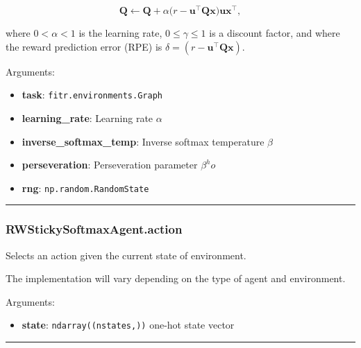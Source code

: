 \[
\mathbf Q \gets \mathbf Q + \alpha \big(r - \mathbf u^\top \mathbf Q \mathbf x \big) \mathbf u \mathbf x^\top,
\]

where \(0 < \alpha < 1\) is the learning rate, \(0 \leq \gamma \leq 1\)
is a discount factor, and where the reward prediction error (RPE) is
\(\delta = (r - \mathbf u^\top \mathbf Q \mathbf x)\).

Arguments:

\begin{itemize}
\tightlist
\item
  \textbf{task}: \texttt{fitr.environments.Graph}
\item
  \textbf{learning\_rate}: Learning rate \(\alpha\)
\item
  \textbf{inverse\_softmax\_temp}: Inverse softmax temperature \(\beta\)
\item
  \textbf{perseveration}: Perseveration parameter \(\beta^ ho\)
\item
  \textbf{rng}: \texttt{np.random.RandomState}
\end{itemize}

\begin{center}\rule{0.5\linewidth}{\linethickness}\end{center}

\subsubsection{RWStickySoftmaxAgent.action}\label{rwstickysoftmaxagent.action}

\begin{Shaded}
\begin{Highlighting}[]
\end{Highlighting}
\end{Shaded}

Selects an action given the current state of environment.

The implementation will vary depending on the type of agent and
environment.

Arguments:

\begin{itemize}
\tightlist
\item
  \textbf{state}: \texttt{ndarray((nstates,))} one-hot state vector
\end{itemize}

\begin{center}\rule{0.5\linewidth}{\linethickness}\end{center}

